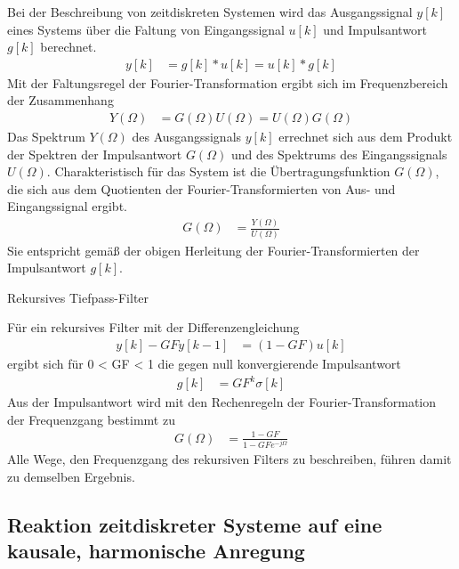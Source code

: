 Bei der Beschreibung von zeitdiskreten Systemen wird das Ausgangssignal \(y[k]\) eines Systems über die Faltung von Eingangssignal \(u[k]\) und Impulsantwort \(g[k]\) berechnet.
\begin{align}
y[ k] &= g[ k]*u[ k] = u[ k]*g[ k] \label{eq:8.12}
\end{align}
Mit der Faltungsregel der Fourier-Transformation ergibt sich im Frequenzbereich der Zusammenhang
\begin{align}
Y(\Omega) &= G(\Omega)  U(\Omega) = U(\Omega)  G(\Omega) \label{eq:8.13}
\end{align}
Das Spektrum \(Y(Ω)\) des Ausgangssignals \(y[k]\) errechnet sich aus dem Produkt der Spektren der Impulsantwort \(G(Ω)\) und des Spektrums des Eingangssignals \(U(Ω)\). Charakteristisch für das System ist die Übertragungsfunktion \(G(Ω)\), die sich aus dem Quotienten der Fourier-Transformierten von Aus- und Eingangssignal ergibt.
\begin{align}
G(\Omega) &= \frac{Y(\Omega)}{U(\Omega)} \label{eq:8.14}
\end{align}
Sie entspricht gemäß der obigen Herleitung der Fourier-Transformierten der Impulsantwort \(g[k]\).

\begin{example}{Rekursives Tiefpass-Filter}
\label{example:beispiel-rekursives-tiefpass-filter-2}

Für ein rekursives Filter mit der Differenzengleichung
\begin{align*}
y[ k] - GF  y[ k - 1] &= (1 - GF)  u[ k] 
\end{align*}
ergibt sich für 0 \textless{} GF \textless{} 1 die gegen null konvergierende Impulsantwort
\begin{align*}
g[ k] &= GF^{k}  \sigma[ k] 
\end{align*}
Aus der Impulsantwort wird mit den Rechenregeln der Fourier-Transformation der Frequenzgang bestimmt zu
\begin{align*}
G(\Omega) &= \frac{1 - GF}{1 - GF  e^{- j  \Omega}} 
\end{align*}
Alle Wege, den Frequenzgang des rekursiven Filters zu beschreiben, führen damit zu demselben Ergebnis.

\end{example}

\subsection{Reaktion zeitdiskreter Systeme auf eine kausale, harmonische Anregung}\label{sec:reaktion-zeitdiskreter-systeme-auf-eine-kausale-harmonische-anregung}

